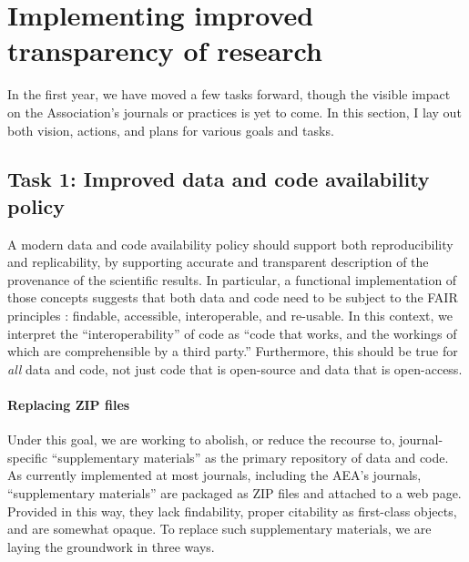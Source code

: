 \documentclass[AEJ]{AEA}
\begin{document}
\section{Implementing improved transparency of research}
In the first year, we have moved a few tasks forward, though the visible impact on the Association's journals or practices is yet to come. In this section, I lay out both vision, actions, and plans for various goals and tasks. 


\FloatBarrier

\subsection{Task 1: Improved data and code availability policy}
A modern data and code availability policy should support both reproducibility and replicability, by supporting accurate and transparent description of the provenance of the scientific results. In particular, a functional implementation of those concepts suggests that both data and code need to be subject to the \ac{FAIR} principles \citep{FORCE11FAIRDATAPRINCIPLES}: findable, accessible, interoperable, and re-usable. In this context, we interpret the ``interoperability'' of code as ``code that works, and the workings of which are comprehensible by a third party.'' Furthermore, this should be true for \textit{all} data and code, not just code that is open-source and data that is open-access.

\paragraph{Replacing ZIP files} Under this goal, we are working to abolish, or reduce the recourse to, journal-specific ``supplementary materials'' as the primary repository of data and code. As currently implemented at most journals, including the \ac{AEA}'s journals, ``supplementary materials'' are packaged as ZIP files and attached to a web page. Provided in this way, they lack findability, proper citability as first-class objects, and are somewhat opaque. 
To replace such supplementary materials, we are laying the groundwork in three ways. 
\end{document}

